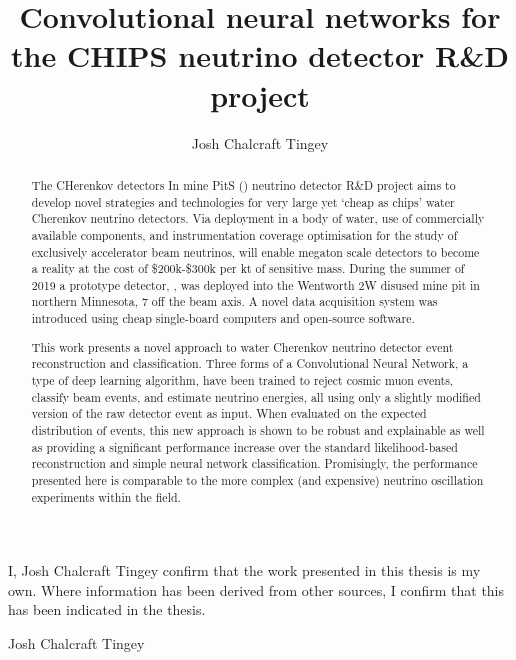 
\title{Convolutional neural networks for the CHIPS neutrino detector R\&D project}
\author{Josh Chalcraft Tingey}

\thispagestyle{plain}

\begin{declaration} %
    I, Josh Chalcraft Tingey confirm that the work presented in this thesis is my own. Where
    information has been derived from other sources, I confirm that this has been indicated in the
    thesis.
    \vspace*{1cm}
    \begin{flushright}
        Josh Chalcraft Tingey
    \end{flushright}
\end{declaration}

\begin{abstract} %
    The CHerenkov detectors In mine PitS (\chips) neutrino detector R\&D project aims to develop
    novel strategies and technologies for very large yet `cheap as chips' water Cherenkov neutrino
    detectors. Via deployment in a body of water, use of commercially available components, and
    instrumentation coverage optimisation for the study of exclusively accelerator beam neutrinos,
    \chips will enable megaton scale detectors to become a reality at the cost of \$200k-\$300k
    per kt of sensitive mass. During the summer of 2019 a prototype \chips detector, \chipsfive,
    was deployed into the Wentworth 2W disused mine pit in northern Minnesota, \SI{7}{}
    off the \numi beam axis. A novel data acquisition system was introduced using cheap
    single-board computers and open-source software.

    This work presents a novel approach to water Cherenkov neutrino detector event reconstruction
    and classification. Three forms of a Convolutional Neural Network, a type of deep learning
    algorithm, have been trained to reject cosmic muon events, classify beam events, and estimate
    neutrino energies, all using only a slightly modified version of the raw detector event as
    input. When evaluated on the expected distribution of \chipsfive events, this new approach is
    shown to be robust and explainable as well as providing a significant performance increase
    over the standard likelihood-based reconstruction and simple neural network classification.
    Promisingly, the performance presented here is comparable to the more complex (and expensive)
    neutrino oscillation experiments within the field.
\end{abstract}

